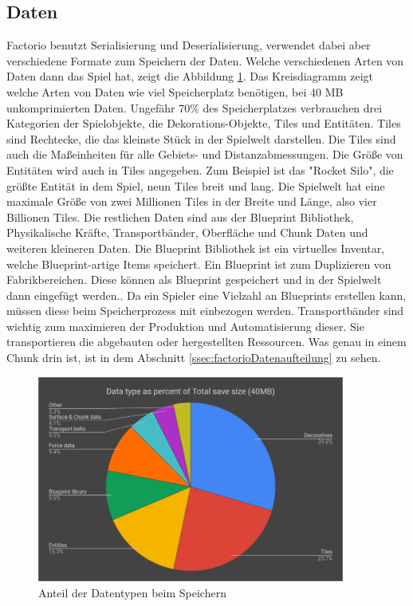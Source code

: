 \subsection{Daten}
Factorio benutzt Serialisierung und Deserialisierung, verwendet dabei aber verschiedene Formate zum Speichern der Daten. Welche verschiedenen Arten von Daten dann das Spiel hat, zeigt die Abbildung \ref{fig:factorioSaveStatistic}. Das Kreisdiagramm zeigt welche Arten von Daten wie viel Speicherplatz benötigen, bei 40 MB unkomprimierten Daten. Ungefähr 70\% des Speicherplatzes verbrauchen drei Kategorien der Spielobjekte, die Dekorations-Objekte, Tiles und Entitäten. Tiles sind Rechtecke, die das kleinste Stück in der Spielwelt darstellen. Die Tiles sind auch die Maßeinheiten für alle Gebiets- und Distanzabmessungen. Die Größe von Entitäten wird auch in Tiles angegeben. Zum Beispiel ist das "Rocket Silo", die größte Entität in dem Spiel, neun Tiles breit und lang. Die Spielwelt hat eine maximale Größe von zwei Millionen Tiles in der Breite und Länge, also vier Billionen Tiles.\cite{factorioMapStructure} Die restlichen Daten sind aus der Blueprint Bibliothek, Physikalische Kräfte, Transportbänder, Oberfläche und Chunk Daten und weiteren kleineren Daten.\cite{factorioFridayFacts270} Die Blueprint Bibliothek ist ein virtuelles Inventar, welche Blueprint-artige Items speichert.\cite{factorioBlueprintLibrary} Ein Blueprint ist zum Duplizieren von Fabrikbereichen. Diese können als Blueprint gespeichert und in der Spielwelt dann eingefügt werden.\cite{factorioBlueprint}. Da ein Spieler eine Vielzahl an Blueprints erstellen kann, müssen diese beim Speicherprozess mit einbezogen werden. Transportbänder sind wichtig zum maximieren der Produktion und Automatisierung dieser. Sie transportieren die abgebauten oder hergestellten Ressourcen. Was genau in einem Chunk drin ist, ist in dem Abschnitt \ref{ssec:factorioDatenaufteilung} zu sehen. 

\begin{figure}[htp]
    \centering
    \includegraphics[width=0.9\textwidth]{images/factorio_save_statistic.png}
    \caption{Anteil der Datentypen beim Speichern\cite{factorioFridayFacts270}}
    \label{fig:factorioSaveStatistic}
\end{figure}



